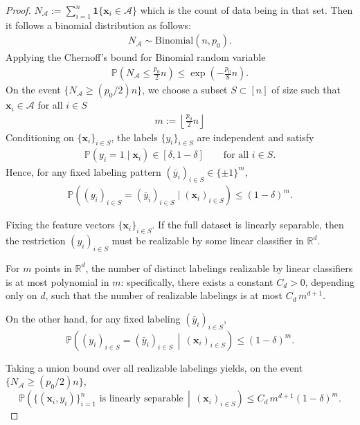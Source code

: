 \documentclass{article}
\theoremstyle{plain}
\theoremstyle{definition}
\theoremstyle{remark}
\begin{document}
{\begin{proof}
 $N_{\mathcal{A}}:=\sum_{i=1}^n \mathbf{1}\{\mathbf{x}_i\in\mathcal{A}\}$ which is the count of data being in that set. Then it follows a binomial distribution as follows:
\begin{align}
N_{\mathcal{A}} \sim \mathrm{Binomial}(n,p_0).
\end{align}
Applying the Chernoff's bound for Binomial random variable 
\begin{align}
\mathbb{P}\!\left(N_{\mathcal{A}}\le \frac{p_0}{2}n\right)
\le \exp\!\left(-\frac{p_0}{8}n\right).
\label{eq:chernoff}
\end{align}
On the event $\{N_{\mathcal{A}}\ge (p_0/2)n\}$, we choose a subset $S\subset[n]$ of size such that $\mathbf{x}_i\in\mathcal{A}$ for all $i\in S$
\begin{align}
m := \left\lfloor \frac{p_0}{2}n\right\rfloor
\end{align}
Conditioning on $\{\mathbf{x}_i\}_{i\in S}$, the labels $\{y_i\}_{i\in S}$ are independent and satisfy
\begin{align}
\mathbb{P}(y_i=1\mid \mathbf{x}_i)\in[\delta,1-\delta]
\qquad \text{for all } i\in S.
\end{align}
Hence, for any fixed labeling pattern $(\bar y_i)_{i\in S}\in\{\pm 1\}^m$,
\begin{align}
\mathbb{P}\!\left((y_i)_{i\in S}=(\bar y_i)_{i\in S}\mid (\mathbf{x}_i)_{i\in S}\right)
\le (1-\delta)^m.
\label{eq:fixed-label-prob}
\end{align}

Fixing the feature vectors $\{\mathbf x_i\}_{i\in S}$. 
If the full dataset is linearly separable, then the restriction
$(y_i)_{i\in S}$ must be realizable by some linear classifier in
$\mathbb R^d$.

For $m$ points in $\mathbb R^d$, the number of distinct labelings
realizable by linear classifiers is at most polynomial in $m$:
specifically, there exists a constant $C_d>0$, depending only on $d$,
such that the number of realizable labelings is at most $C_d\,m^{d+1}$.

On the other hand, for any fixed labeling $(\bar y_i)_{i\in S}$,
\[
\mathbb P\!\left((y_i)_{i\in S} = (\bar y_i)_{i\in S}
\,\middle|\,
(\mathbf x_i)_{i\in S}\right)
\le (1-\delta)^m.
\]

Taking a union bound over all realizable labelings yields, on the event
$\{N_{\mathcal A}\ge (p_0/2)n\}$,
\[
\mathbb P\!\left(\{(\mathbf x_i,y_i)\}_{i=1}^n
\text{ is linearly separable}
\,\middle|\,
(\mathbf x_i)_{i\in S}\right)
\le C_d\,m^{d+1}(1-\delta)^m.
\]


\end{proof}}
\end{document}
